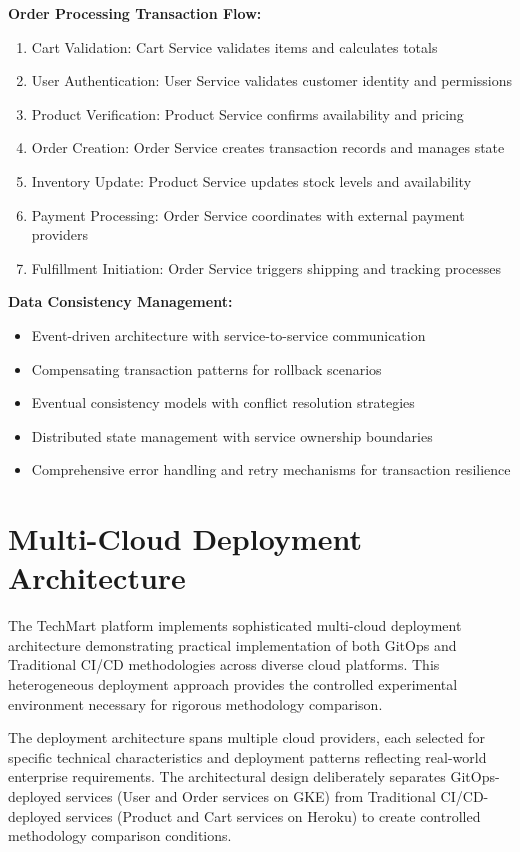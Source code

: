 \textbf{Order Processing Transaction Flow:}
\begin{enumerate}
\item Cart Validation: Cart Service validates items and calculates totals
\item User Authentication: User Service validates customer identity and permissions
\item Product Verification: Product Service confirms availability and pricing
\item Order Creation: Order Service creates transaction records and manages state
\item Inventory Update: Product Service updates stock levels and availability
\item Payment Processing: Order Service coordinates with external payment providers
\item Fulfillment Initiation: Order Service triggers shipping and tracking processes
\end{enumerate}

\textbf{Data Consistency Management:}
\begin{itemize}
\item Event-driven architecture with service-to-service communication
\item Compensating transaction patterns for rollback scenarios
\item Eventual consistency models with conflict resolution strategies
\item Distributed state management with service ownership boundaries
\item Comprehensive error handling and retry mechanisms for transaction resilience
\end{itemize}

\section{Multi-Cloud Deployment Architecture}

The TechMart platform implements sophisticated multi-cloud deployment architecture demonstrating practical implementation of both GitOps and Traditional CI/CD methodologies across diverse cloud platforms. This heterogeneous deployment approach provides the controlled experimental environment necessary for rigorous methodology comparison.

The deployment architecture spans multiple cloud providers, each selected for specific technical characteristics and deployment patterns reflecting real-world enterprise requirements. The architectural design deliberately separates GitOps-deployed services (User and Order services on GKE) from Traditional CI/CD-deployed services (Product and Cart services on Heroku) to create controlled methodology comparison conditions.

